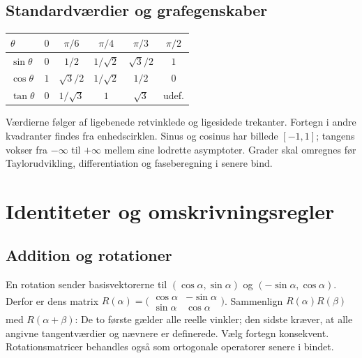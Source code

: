 \subsection{Standardværdier og grafegenskaber}
\begin{center}
\begin{tabular}{@{}lccccc@{}}
\toprule
$\theta$ & $0$ & $\pi/6$ & $\pi/4$ & $\pi/3$ & $\pi/2$\\\midrule
$\sin\theta$ & $0$ & $1/2$ & $1/\sqrt2$ & $\sqrt3/2$ & $1$\\
$\cos\theta$ & $1$ & $\sqrt3/2$ & $1/\sqrt2$ & $1/2$ & $0$\\
$\tan\theta$ & $0$ & $1/\sqrt3$ & $1$ & $\sqrt3$ & udef.\\\bottomrule
\end{tabular}
\end{center}
Værdierne følger af ligebenede retvinklede og ligesidede trekanter.
Fortegn i andre kvadranter findes fra enhedscirklen.
Sinus og cosinus har billede $[-1,1]$; tangens vokser fra $-\infty$ til
$+\infty$ mellem sine lodrette asymptoter. Grader skal omregnes før
Taylorudvikling, differentiation og faseberegning i senere bind.



\section{Identiteter og omskrivningsregler}
\subsection{Addition og rotationer}
En rotation sender basisvektorerne til
$(\cos\alpha,\sin\alpha)$ og $(-\sin\alpha,\cos\alpha)$.
Derfor er dens matrix
$R(\alpha)=\bigl(\begin{smallmatrix}\cos\alpha&-\sin\alpha\\
\sin\alpha&\cos\alpha\end{smallmatrix}\bigr)$.
Sammenlign $R(\alpha)R(\beta)$ med $R(\alpha+\beta)$:
De to første gælder alle reelle vinkler; den sidste kræver, at alle
angivne tangentværdier og nævnere er definerede. Vælg fortegn konsekvent.
Rotationsmatricer behandles også som ortogonale operatorer senere i bindet.

